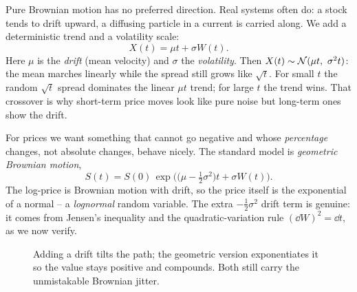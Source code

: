 Pure Brownian motion has no preferred direction. Real systems often do: a stock
tends to drift upward, a diffusing particle in a current is carried along. We add
a deterministic trend and a volatility scale:
\[
  X(t) = \mu t + \sigma W(t).
\]
Here $\mu$ is the \emph{drift} (mean velocity) and $\sigma$ the \emph{volatility}.
Then $X(t)\sim\mathcal{N}(\mu t,\ \sigma^2 t)$: the mean marches linearly while the
spread still grows like $\sqrt t$. For small $t$ the random $\sqrt t$ spread
dominates the linear $\mu t$ trend; for large $t$ the trend wins. That crossover
is why short-term price moves look like pure noise but long-term ones show the
drift.

For prices we want something that cannot go negative and whose \emph{percentage}
changes, not absolute changes, behave nicely. The standard model is
\emph{geometric Brownian motion},
\[
  S(t) = S(0)\,\exp\!\Big(\big(\mu - \tfrac12\sigma^2\big)t + \sigma W(t)\Big).
\]
The log-price is Brownian motion with drift, so the price itself is the
exponential of a normal -- a \emph{lognormal} random variable. The extra
$-\tfrac12\sigma^2$ drift term is genuine: it comes from Jensen's inequality and
the quadratic-variation rule $(\dd W)^2=\dd t$, as we now verify.

\begin{figure}[H]
\centering
{}
\caption{Adding a drift tilts the path; the geometric version exponentiates it so
the value stays positive and compounds. Both still carry the unmistakable
Brownian jitter.}
\label{ch29:fig-drift}
\end{figure}

